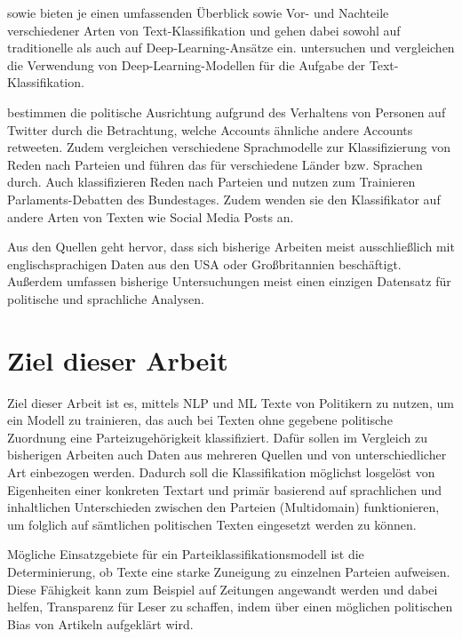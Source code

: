 \textcite{li_survey_2021} sowie \textcite{kowsari_text_2019} bieten je einen umfassenden Überblick sowie Vor- und Nachteile verschiedener Arten von Text-Klassifikation und gehen dabei sowohl auf traditionelle als auch auf Deep-Learning-Ansätze ein.
\textcite{minaee_deep_2022} untersuchen und vergleichen die Verwendung von Deep-Learning-Modellen für die Aufgabe der Text-Klassifikation.

\textcite{wong_quantifying_2016} bestimmen die politische Ausrichtung aufgrund des Verhaltens von Personen auf Twitter durch die Betrachtung, welche Accounts ähnliche andere Accounts retweeten.
Zudem vergleichen \textcite{doan_using_2022} verschiedene Sprachmodelle zur Klassifizierung von Reden nach Parteien und führen das für verschiedene Länder bzw. Sprachen durch.
Auch \textcite{biessmann_predicting_2016} klassifizieren Reden nach Parteien und nutzen zum Trainieren Parlaments-Debatten des Bundestages. Zudem wenden sie den Klassifikator auf andere Arten von Texten wie Social Media Posts an.

Aus den Quellen geht hervor, dass sich bisherige Arbeiten meist ausschließlich mit englischsprachigen Daten aus den USA oder Großbritannien beschäftigt. Außerdem umfassen bisherige Untersuchungen meist einen einzigen Datensatz für politische und sprachliche Analysen.

\section{Ziel dieser Arbeit} \label{sec:thesisGoal}

Ziel dieser Arbeit ist es, mittels \ac{NLP} und \ac{ML} Texte von Politikern zu nutzen, um ein Modell zu trainieren, das auch bei Texten ohne gegebene politische Zuordnung eine Parteizugehörigkeit klassifiziert. Dafür sollen im Vergleich zu bisherigen Arbeiten auch Daten aus mehreren Quellen und von unterschiedlicher Art einbezogen werden. Dadurch soll die Klassifikation möglichst losgelöst von Eigenheiten einer konkreten Textart und primär basierend auf sprachlichen und inhaltlichen Unterschieden zwischen den Parteien (Multidomain) funktionieren, um folglich auf sämtlichen politischen Texten eingesetzt werden zu können.

Mögliche Einsatzgebiete für ein Parteiklassifikationsmodell ist die Determinierung, ob Texte eine starke Zuneigung zu einzelnen Parteien aufweisen. Diese Fähigkeit kann zum Beispiel auf Zeitungen angewandt werden und dabei helfen, Transparenz für Leser zu schaffen, indem über einen möglichen politischen Bias von Artikeln aufgeklärt wird.

